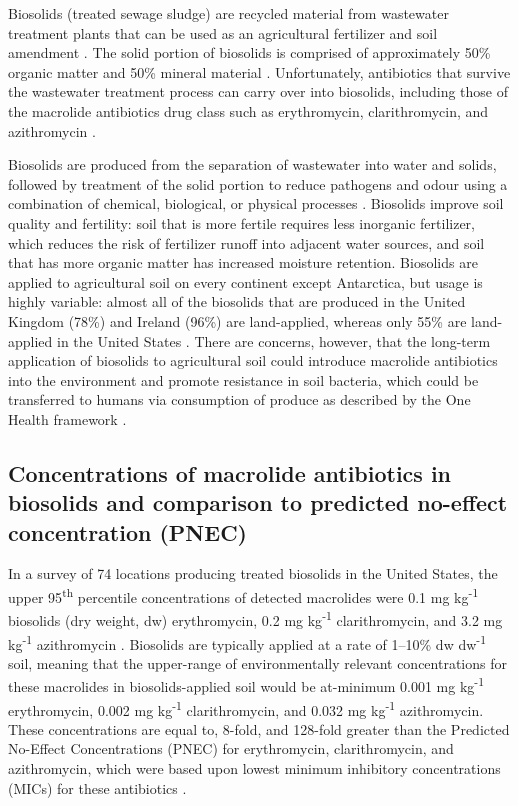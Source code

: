Biosolids (treated sewage sludge) are recycled material from wastewater treatment plants that can be used as an agricultural fertilizer and soil amendment \parencite{Sharma.2017}.
The solid portion of biosolids is comprised of approximately 50\% organic matter and 50\% mineral material \parencite{OntarioMinistryofAgricultureFoodandRuralAffairs.2010}.
Unfortunately, antibiotics that survive the wastewater treatment process can carry over into biosolids, including those of the macrolide antibiotics drug class such as erythromycin, clarithromycin, and azithromycin \parencite{McClellan.2010, Sabourin.2012, Chenxi.2008}.

Biosolids are produced from the separation of wastewater into water and solids, followed by treatment of the solid portion to reduce pathogens and odour using a combination of chemical, biological, or physical processes \parencite{LeMinh.2010}.
Biosolids improve soil quality and fertility:
soil that is more fertile requires less inorganic fertilizer, which reduces the risk of fertilizer runoff into adjacent water sources, and soil that has more organic matter has increased moisture retention.
Biosolids are applied to agricultural soil on every continent except Antarctica, but usage is highly variable:
almost all of the biosolids that are produced in the United Kingdom (78\%) and Ireland (96\%) are land-applied, whereas only 55\% are land-applied in the United States \parencite{Sharma.2017}.
There are concerns, however, that the long-term application of biosolids to agricultural soil could introduce macrolide antibiotics into the environment and promote resistance in soil bacteria, which could be transferred to humans via consumption of produce as described by the One Health framework \parencite{Lau.2020, Sabourin.2012}.

\subsection{Concentrations of macrolide antibiotics in biosolids and comparison to predicted no-effect concentration (PNEC)}

In a survey of 74 locations producing treated biosolids in the United States, the upper 95\textsuperscript{th} percentile concentrations of detected macrolides were 0.1 mg kg\textsuperscript{-1} biosolids (dry weight, dw) erythromycin, 0.2 mg kg\textsuperscript{-1} clarithromycin, and 3.2 mg kg\textsuperscript{-1} azithromycin \parencite{U.S.EnvironmentalProtectionAgency.2021}.
Biosolids are typically applied at a rate of 1--10\% dw dw\textsuperscript{-1} soil, meaning that the upper-range of environmentally relevant concentrations for these macrolides in biosolids-applied soil would be at-minimum 0.001 mg kg\textsuperscript{-1} erythromycin, 0.002 mg kg\textsuperscript{-1} clarithromycin, and 0.032 mg kg\textsuperscript{-1} azithromycin.
These concentrations are equal to, 8-fold, and 128-fold greater than the Predicted No-Effect Concentrations (PNEC) for erythromycin, clarithromycin, and azithromycin, which were based upon lowest minimum inhibitory concentrations (MICs) for these antibiotics \parencite{BengtssonPalme.2016}.

